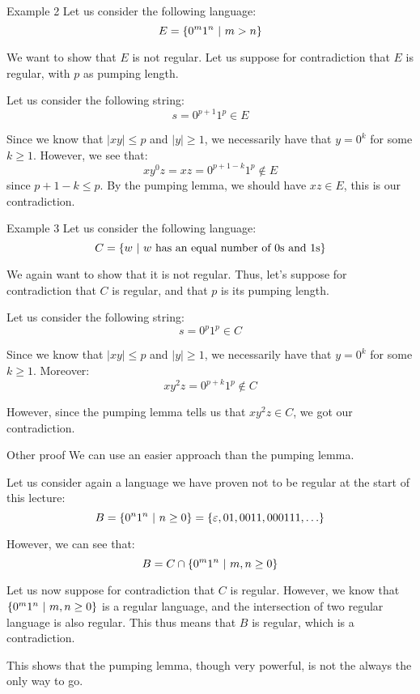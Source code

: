 \documentclass[a4paper]{article}
\begin{document}
\begin{parag}{Example 2}
    Let us consider the following language: 
    \[E = \left\{0^m 1^n \suchthat m > n\right\}\]
 
    We want to show that $E$ is not regular. Let us suppose for contradiction that $E$ is regular, with $p$ as pumping length.

    Let us consider the following string: 
    \[s = 0^{p+1} 1^{p} \in E\]
    
    Since we know that $\left|xy\right| \leq p$ and $\left|y\right| \geq 1$, we necessarily have that $y = 0^k$ for some $k \geq 1$. However, we see that: 
    \[x y^0 z = xz = 0^{p+1-k} 1^p \not \in E\]
    since $p + 1 - k \leq p$. By the pumping lemma, we should have $xz \in E$, this is our contradiction.
\end{parag}

\begin{parag}{Example 3}
    Let us consider the following language: 
    \[C = \left\{w \suchthat w \text{ has an equal number of 0s and 1s}\right\}\]
    
    We again want to show that it is not regular. Thus, let's suppose for contradiction that $C$ is regular, and that $p$ is its pumping length.

    Let us consider the following string:
    \[s = 0^p 1^p \in C\]

    Since we know that $\left|xy\right| \leq p$ and $\left|y\right| \geq 1$, we necessarily have that $y = 0^k$ for some $k \geq 1$. Moreover: 
    \[x y^2 z = 0^{p+k} 1^p \not \in C\]
    
    However, since the pumping lemma tells us that $x y^2 z \in C$, we got our contradiction.

    \begin{subparag}{Other proof}
        We can use an easier approach than the pumping lemma. 

        Let us consider again a language we have proven not to be regular at the start of this lecture: 
        \[B = \left\{0^n 1^n \suchthat n \geq 0\right\} = \left\{\epsilon, 01, 0011, 000111, \ldots\right\}\]
        
        However, we can see that: 
        \[B = C \cap \left\{0^m 1^n \suchthat m, n \geq 0\right\}\]
        
        Let us now suppose for contradiction that $C$ is regular. However, we know that $\left\{0^m 1^n \suchthat m, n \geq 0\right\}$ is a regular language, and the intersection of two regular language is also regular. This thus means that $B$ is regular, which is a contradiction.

        This shows that the pumping lemma, though very powerful, is not the always the only way to go.
    \end{subparag}
\end{parag}
\end{document}

